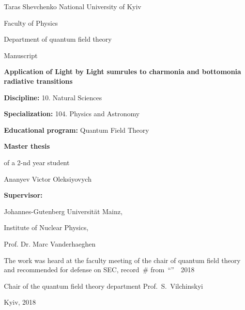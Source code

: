 \begin{titlepage}
    \fontsize{12}{12}\selectfont

    \begin{center}
        Taras Shevchenko National University of Kyiv

        Faculty of Physics

        Department of quantum field theory
    \end{center}

    \begin{flushright}
        Manuscript
    \end{flushright}

    \vfill

    \begin{center}
        \textbf{Application of Light by Light sumrules to charmonia and bottomonia radiative transitions}
    \end{center}

    \vfill

    \textbf{Discipline:} 10. Natural Sciences

    \textbf{Specialization:} 104. Physics and Astronomy

    \textbf{Educational program:} Quantum Field Theory

    \vfill

    \hfill\parbox[t]{8cm}{
        \textbf{Master thesis}

        of a 2-nd year student

        Ananyev Victor Oleksiyovych
    }

    \vspace{1cm}

    \hfill\parbox[t]{8cm}{
        \textbf{Supervisor:}

        Johannes-Gutenberg Universität Mainz,

        Institute of Nuclear Physics,
        
        Prof. Dr. Marc Vanderhaeghen
    }

    \vfill

    {\small
        \noindent The work was heard at the faculty meeting of the chair of quantum field theory and recommended for defense on SEC, record~\# from~``''~~2018

        \vspace{0.5cm}

        \noindent Chair of the quantum field theory department \hfill  Prof.~S.~Vilchinskyi
    }

    \vspace{0.8cm}

    \begin{center}
        Kyiv, 2018
    \end{center}
\end{titlepage}
